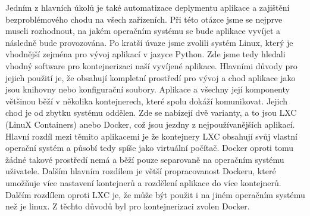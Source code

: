 Jedním z hlavních úkolů je také automatizace deplymentu aplikace a zajištění bezproblémového chodu na všech zařízeních. Při této otázce jsme se nejprve museli rozhodnout, na jakém operačním systému se bude aplikace vyvíjet a následně bude provozována. Po kratší úvaze jsme zvolili systém Linux, který je vhodnější zejména pro vývoj aplikací v jazyce Python. Zde jsme tedy hledali vhodný software pro kontejnerizaci naší vyvíjené aplikace. Hlavními důvody pro jejich použití je, že obsahují kompletní prostředí pro vývoj a chod aplikace jako jsou knihovny nebo konfigurační soubory. Aplikace a všechny její komponenty většinou běží v několika kontejnerech, které spolu dokáží komunikovat. Jejich chod je od zbytku systému oddělen. Zde se nabízejí dvě varianty, a to jsou LXC (LinuX Containers) anebo Docker, což jsou jezdny z nejpoužívanějších aplikací. Hlavní rozdíl mezi těmito aplikacemi je že kontejnery LXC obsahují svůj vlastní operační systém a působí tedy spíše jako virtuální počítač. Docker oproti tomu žádné takové prostředí nemá a běží pouze separovaně na operačním systému uživatele. Dalším hlavním rozdílem je větší propracovanost Dockeru, které umožňuje více nastavení kontejnerů a rozdělení aplikace do více kontejnerů. Dalěím rozdílem oproti LXC je, že může být použit i na jiném operačním systému než je linux. Z těchto důvodů byl pro kontejnerizaci zvolen Docker.

\textbf{}
\textit{}



















